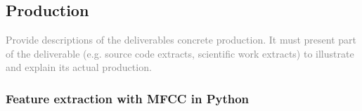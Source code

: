 \subsection{Production}
\textcolor{gray}{Provide descriptions of the deliverables concrete production.
It must present part of the deliverable (e.g. source code extracts, scientific
work extracts) to illustrate and explain its actual production.}

\subsubsection{Feature extraction with MFCC in Python}~\label{librosa}
